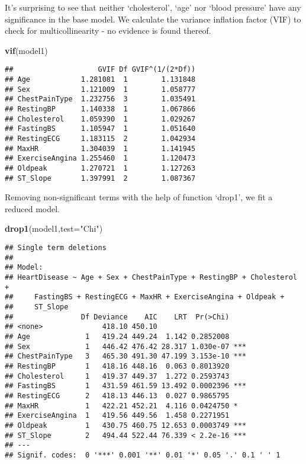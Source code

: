 \documentclass[
]{article}
\newenvironment{Shaded}{\begin{snugshade}}{\end{snugshade}}
\newcommand{\AttributeTok}[1]{\textcolor[rgb]{0.13,0.29,0.53}{#1}}
\newcommand{\FunctionTok}[1]{\textcolor[rgb]{0.13,0.29,0.53}{\textbf{#1}}}
\newcommand{\NormalTok}[1]{#1}
\newcommand{\StringTok}[1]{\textcolor[rgb]{0.31,0.60,0.02}{#1}}
\begin{document}
It's surprising to see that neither `cholesterol', `age' nor `blood
pressure' have any significance in the base model. We calculate the
variance inflation factor (VIF) to check for multicollinearity - no
evidence is found thereof.

\begin{Shaded}
\begin{Highlighting}[]
\FunctionTok{vif}\NormalTok{(model1)}
\end{Highlighting}
\end{Shaded}

\begin{verbatim}
##                    GVIF Df GVIF^(1/(2*Df))
## Age            1.281081  1        1.131848
## Sex            1.121009  1        1.058777
## ChestPainType  1.232756  3        1.035491
## RestingBP      1.140338  1        1.067866
## Cholesterol    1.059390  1        1.029267
## FastingBS      1.105947  1        1.051640
## RestingECG     1.183115  2        1.042934
## MaxHR          1.304039  1        1.141945
## ExerciseAngina 1.255460  1        1.120473
## Oldpeak        1.270721  1        1.127263
## ST_Slope       1.397991  2        1.087367
\end{verbatim}

Removing non-significant terms with the help of function `drop1', we fit
a reduced model.

\begin{Shaded}
\begin{Highlighting}[]
\FunctionTok{drop1}\NormalTok{(model1,}\AttributeTok{test=}\StringTok{"Chi"}\NormalTok{)}
\end{Highlighting}
\end{Shaded}

\begin{verbatim}
## Single term deletions
## 
## Model:
## HeartDisease ~ Age + Sex + ChestPainType + RestingBP + Cholesterol + 
##     FastingBS + RestingECG + MaxHR + ExerciseAngina + Oldpeak + 
##     ST_Slope
##                Df Deviance    AIC    LRT  Pr(>Chi)    
## <none>              418.10 450.10                     
## Age             1   419.24 449.24  1.142 0.2852008    
## Sex             1   446.42 476.42 28.317 1.030e-07 ***
## ChestPainType   3   465.30 491.30 47.199 3.153e-10 ***
## RestingBP       1   418.16 448.16  0.063 0.8013920    
## Cholesterol     1   419.37 449.37  1.272 0.2593743    
## FastingBS       1   431.59 461.59 13.492 0.0002396 ***
## RestingECG      2   418.13 446.13  0.027 0.9865795    
## MaxHR           1   422.21 452.21  4.116 0.0424750 *  
## ExerciseAngina  1   419.56 449.56  1.458 0.2271951    
## Oldpeak         1   430.75 460.75 12.653 0.0003749 ***
## ST_Slope        2   494.44 522.44 76.339 < 2.2e-16 ***
## ---
## Signif. codes:  0 '***' 0.001 '**' 0.01 '*' 0.05 '.' 0.1 ' ' 1
\end{verbatim}
\end{document}
